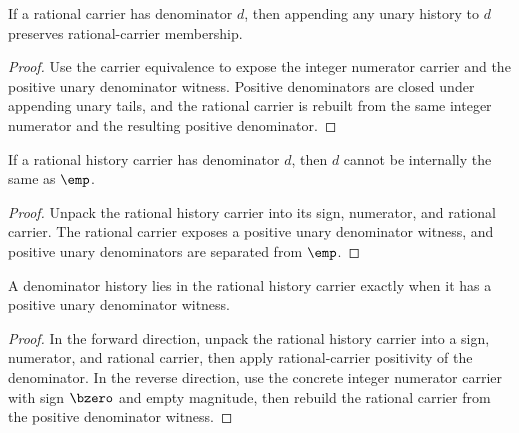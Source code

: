 \begin{theorem}
\label{thm:rat-carrier-append-unary-denominator-closed}
If a rational carrier has denominator \(d\), then appending any unary history to
\(d\) preserves rational-carrier membership.
\end{theorem}
\begin{proof}
Use the carrier equivalence to expose the integer numerator carrier and the
positive unary denominator witness. Positive denominators are closed under
appending unary tails, and the rational carrier is rebuilt from the same
integer numerator and the resulting positive denominator.
\end{proof}

\begin{theorem}
\label{thm:rat-history-carrier-not-empty}
If a rational history carrier has denominator \(d\), then \(d\) cannot be
internally the same as \(\emp\).
\end{theorem}
\begin{proof}
Unpack the rational history carrier into its sign, numerator, and rational
carrier. The rational carrier exposes a positive unary denominator witness, and
positive unary denominators are separated from \(\emp\).
\end{proof}

\begin{theorem}
\label{thm:rat-history-carrier-positive-denominator-equivalence}
A denominator history lies in the rational history carrier exactly when it has
a positive unary denominator witness.
\end{theorem}
\begin{proof}
In the forward direction, unpack the rational history carrier into a sign,
numerator, and rational carrier, then apply rational-carrier positivity of the
denominator. In the reverse direction, use the concrete integer numerator
carrier with sign $\bzero$ and empty magnitude, then rebuild the rational
carrier from the positive denominator witness.
\end{proof}

